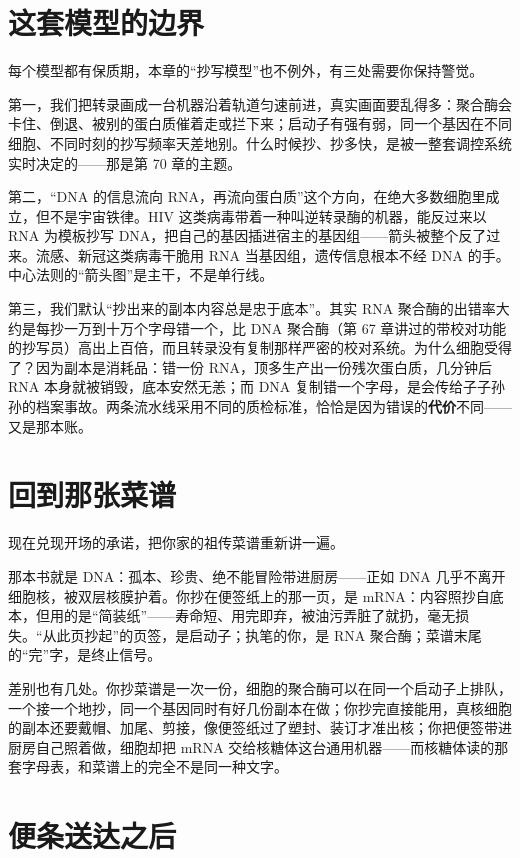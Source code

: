 \section{这套模型的边界}

每个模型都有保质期，本章的“抄写模型”也不例外，有三处需要你保持警觉。

第一，我们把转录画成一台机器沿着轨道匀速前进，真实画面要乱得多：聚合酶会卡住、倒退、被别的蛋白质催着走或拦下来；启动子有强有弱，同一个基因在不同细胞、不同时刻的抄写频率天差地别。什么时候抄、抄多快，是被一整套调控系统实时决定的——那是第 70 章的主题。

第二，“DNA 的信息流向 RNA，再流向蛋白质”这个方向，在绝大多数细胞里成立，但不是宇宙铁律。HIV 这类病毒带着一种叫逆转录酶的机器，能反过来以 RNA 为模板抄写 DNA，把自己的基因插进宿主的基因组——箭头被整个反了过来。流感、新冠这类病毒干脆用 RNA 当基因组，遗传信息根本不经 DNA 的手。中心法则的“箭头图”是主干，不是单行线。

第三，我们默认“抄出来的副本内容总是忠于底本”。其实 RNA 聚合酶的出错率大约是每抄一万到十万个字母错一个，比 DNA 聚合酶（第 67 章讲过的带校对功能的抄写员）高出上百倍，而且转录没有复制那样严密的校对系统。为什么细胞受得了？因为副本是消耗品：错一份 RNA，顶多生产出一份残次蛋白质，几分钟后 RNA 本身就被销毁，底本安然无恙；而 DNA 复制错一个字母，是会传给子子孙孙的档案事故。两条流水线采用不同的质检标准，恰恰是因为错误的\textbf{代价}不同——又是那本账。

\section{回到那张菜谱}

现在兑现开场的承诺，把你家的祖传菜谱重新讲一遍。

那本书就是 DNA：孤本、珍贵、绝不能冒险带进厨房——正如 DNA 几乎不离开细胞核，被双层核膜护着。你抄在便签纸上的那一页，是 mRNA：内容照抄自底本，但用的是“简装纸”——寿命短、用完即弃，被油污弄脏了就扔，毫无损失。“从此页抄起”的页签，是启动子；执笔的你，是 RNA 聚合酶；菜谱末尾的“完”字，是终止信号。

差别也有几处。你抄菜谱是一次一份，细胞的聚合酶可以在同一个启动子上排队，一个接一个地抄，同一个基因同时有好几份副本在做；你抄完直接能用，真核细胞的副本还要戴帽、加尾、剪接，像便签纸过了塑封、装订才准出核；你把便签带进厨房自己照着做，细胞却把 mRNA 交给核糖体这台通用机器——而核糖体读的那套字母表，和菜谱上的完全不是同一种文字。

\section{便条送达之后}


